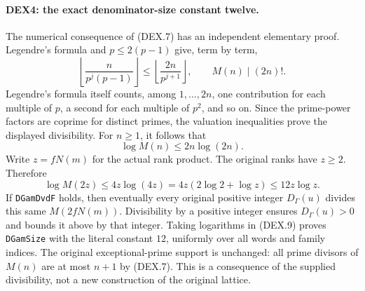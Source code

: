 \documentclass[11pt,a4paper]{article}
\numberwithin{equation}{section}
\theoremstyle{remark}\newtheorem{remark}[theorem]{Remark}
\begin{document}
\paragraph{DEX4: the exact denominator-size constant twelve.}
\label{claim:DEX4}
The numerical consequence of (DEX.7) has an independent elementary
proof. Legendre's formula and $p\le2(p-1)$ give, term by term,
\[
 \left\lfloor\frac{n}{p^j(p-1)}\right\rfloor
 \le \left\lfloor\frac{2n}{p^{j+1}}\right\rfloor,
 \qquad M(n)\mid(2n)! .                                 \tag{DEX.8}
\]
Legendre's formula itself counts, among $1,\ldots,2n$, one contribution
for each multiple of $p$, a second for each multiple of $p^2$, and so
on. Since the prime-power factors are coprime for distinct primes,
the valuation inequalities prove the displayed divisibility. For
$n\ge1$, it follows that
\[
                       \log M(n)\le2n\log(2n).
\]
Write $z=fN(m)$ for the actual rank product. The original ranks have
$z\ge2$. Therefore
\[
 \log M(2z)\le4z\log(4z)
       =4z(2\log2+\log z)\le12z\log z.                 \tag{DEX.9}
\]
If \texttt{DGamDvdF} holds, then eventually every original positive
integer $D_\Gamma(u)$ divides this same $M(2fN(m))$. Divisibility by
a positive integer ensures $D_\Gamma(u)>0$ and bounds it above by that
integer. Taking logarithms in (DEX.9) proves \texttt{DGamSize} with
the literal constant $12$, uniformly over all words and family indices.
The original exceptional-prime support is unchanged: all prime divisors
of $M(n)$ are at most $n+1$ by (DEX.7). This is a consequence of the
supplied divisibility, not a new construction of the original lattice.
\end{document}
